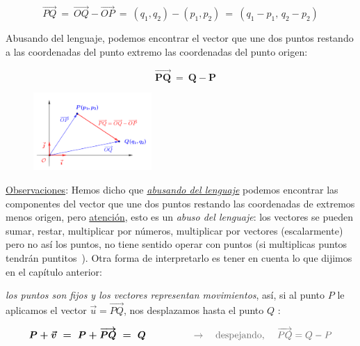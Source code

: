 \vspace{5mm}
\begin{definition}

$$\overrightarrow{PQ} \ = \ \overrightarrow{OQ}-\overrightarrow{OP} \ = \ (q_1,q_2)-(p_1,p_2) \ = \ (q_1-p_1,\, q_2-p_2)$$

\begin{multicols}{2}
\vspace{2mm} Abusando del lenguaje, podemos encontrar el vector que une dos puntos restando a las coordenadas del punto extremo las coordenadas del punto origen: 

$$\quad \boldsymbol{\overrightarrow{PQ}\ = \ Q-P}$$

\begin{figure}[H]
	\centering
	\includegraphics[width=0.4\textwidth]{img-ga/ga05.png}
\end{figure}
\end{multicols}	
\end{definition}

\vspace{5mm}
\underline{Observaciones}: Hemos dicho que \underline{\emph{abusando del lenguaje}} podemos encontrar las componentes del vector que une dos puntos restando las coordenadas de extremos menos origen, pero \underline{atención}, esto es un \emph{abuso del lenguaje}: los vectores se pueden sumar, restar, multiplicar por números, multiplicar por vectores (escalarmente) pero no así los puntos, no tiene sentido operar con puntos (si multiplicas puntos tendrán puntitos \smiley{}$\, $). Otra forma de interpretarlo es tener en cuenta lo que dijimos en el capítulo anterior: 

\begin{destacado}
	\emph{los puntos son fijos y los vectores representan movimientos}, así, si al punto $P$ le aplicamos el vector $\vec u=\overrightarrow{PQ}$, nos desplazamos hasta el punto $Q$ : 
	
\vspace{-4mm} $$\boldsymbol{P+\vec v \ = \ P+\overrightarrow{PQ} \ = \ Q} \qquad \qquad \textcolor{gris}{\quad \to \quad \text{despejando, } \quad \overrightarrow{PQ}=Q-P}$$ 
\end{destacado}


